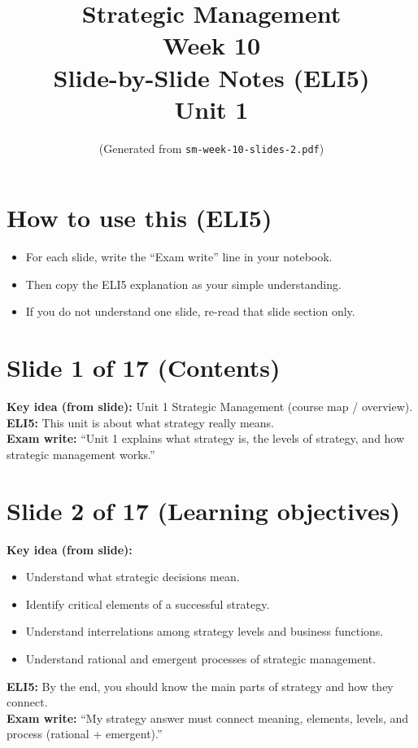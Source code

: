 \documentclass[11pt,a4paper]{article}
\title{Strategic Management \\ Week 10 \\ Slide-by-Slide Notes (ELI5) \\ Unit 1}
\author{(Generated from \texttt{sm-week-10-slides-2.pdf})}
\date{}
\begin{document}
\maketitle

\section*{How to use this (ELI5)}
\begin{itemize}
  \item For each slide, write the ``Exam write'' line in your notebook.
  \item Then copy the ELI5 explanation as your simple understanding.
  \item If you do not understand one slide, re-read that slide section only.
\end{itemize}

\section*{Slide 1 of 17 (Contents)}
\textbf{Key idea (from slide):} Unit 1 Strategic Management (course map / overview).\\
\textbf{ELI5:} This unit is about what strategy really means.\\
\textbf{Exam write:} ``Unit 1 explains what strategy is, the levels of strategy, and how strategic management works.''

\section*{Slide 2 of 17 (Learning objectives)}
\textbf{Key idea (from slide):}
\begin{itemize}
  \item Understand what strategic decisions mean.
  \item Identify critical elements of a successful strategy.
  \item Understand interrelations among strategy levels and business functions.
  \item Understand rational and emergent processes of strategic management.
\end{itemize}
\textbf{ELI5:} By the end, you should know the main parts of strategy and how they connect.\\
\textbf{Exam write:} ``My strategy answer must connect meaning, elements, levels, and process (rational + emergent).'' 
\end{document}
